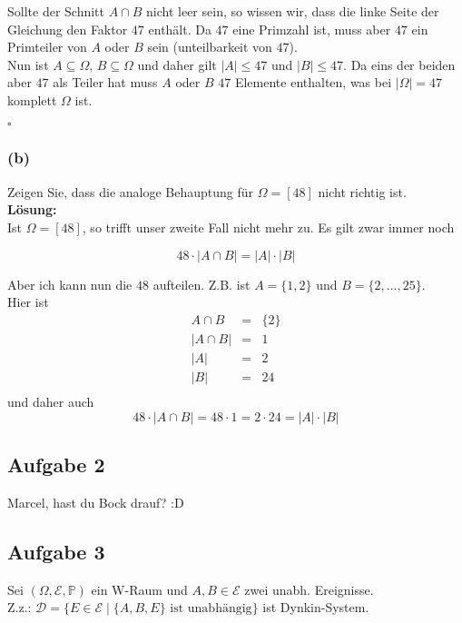 \documentclass[11pt,a4paper,ngerman]{article}
\newcommand{\set}[1]{ \{ #1 \}}
\newcommand{\Prob}{\mathbb{P}}
\newcommand{\Epsilon}{\mathcal{E}}
\begin{document}
Sollte der Schnitt $A \cap B$ nicht leer sein, so wissen wir, dass die linke Seite der Gleichung den Faktor $47$ enthält. Da $47$ eine Primzahl ist, muss
aber $47$ ein Primteiler von $A$ oder $B$ sein (unteilbarkeit von $47$).\\

Nun ist $A \subseteq \Omega$, $B \subseteq \Omega$ und daher gilt $|A| \leq 47$ und $|B| \leq 47$. Da eins der beiden aber $47$ als Teiler hat muss $A$ oder $B$
$47$ Elemente enthalten, was bei $|\Omega| = 47$ komplett $\Omega$ ist.

\mbox{}\hfill$\square$

\subsubsection*{(b)}

Zeigen Sie, dass die analoge Behauptung für $\Omega = [48]$ nicht richtig ist.\\

\textbf{Lösung:}\\

Ist $\Omega = \left[ 48 \right]$, so trifft unser zweite Fall nicht mehr zu. Es gilt zwar immer noch

\[
    48 \cdot \left| A \cap B \right| = |A| \cdot |B|
\]

Aber ich kann nun die $48$ aufteilen. Z.B. ist $A = \{1,2\}$ und $B = \{2,\dots,25\}$.\\

Hier ist
\[
    \begin{array}{rcl}
        A \cap B    &=& \{2\}\\
        |A \cap B| &=& 1\\
        |A|     &=& 2\\
        |B|     &=& 24\\
    \end{array}
\]
und daher auch
\[
    48 \cdot \left| A \cap B \right| = 48 \cdot 1 = 2 \cdot 24 = |A| \cdot |B|
\]

\subsection*{Aufgabe 2}
Marcel, hast du Bock drauf? :D

\subsection*{Aufgabe 3}
\newcommand{\D}{\mathcal{D}}
Sei $(\Omega, \Epsilon, \Prob)$ ein W-Raum und $A,B \in \Epsilon$ zwei unabh. Ereignisse. \\
Z.z.: $\mathcal{D} = \set{E \in \Epsilon \; | \; \set{A,B, E} \text{ ist unabhängig}}$ ist Dynkin-System. \\
\end{document}
